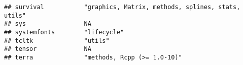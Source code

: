 \documentclass[
]{article}
\begin{document}
\begin{verbatim}
## survival           "graphics, Matrix, methods, splines, stats, utils"                                                                                                                                                                                                                                                                                                                                                                                           
## sys                NA                                                                                                                                                                                                                                                                                                                                                                                                                                           
## systemfonts        "lifecycle"                                                                                                                                                                                                                                                                                                                                                                                                                                  
## tcltk              "utils"                                                                                                                                                                                                                                                                                                                                                                                                                                      
## tensor             NA                                                                                                                                                                                                                                                                                                                                                                                                                                           
## terra              "methods, Rcpp (>= 1.0-10)"                                                                                                                                                                                                                                                                                                                                                                                                                  

\end{verbatim}
\end{document}
